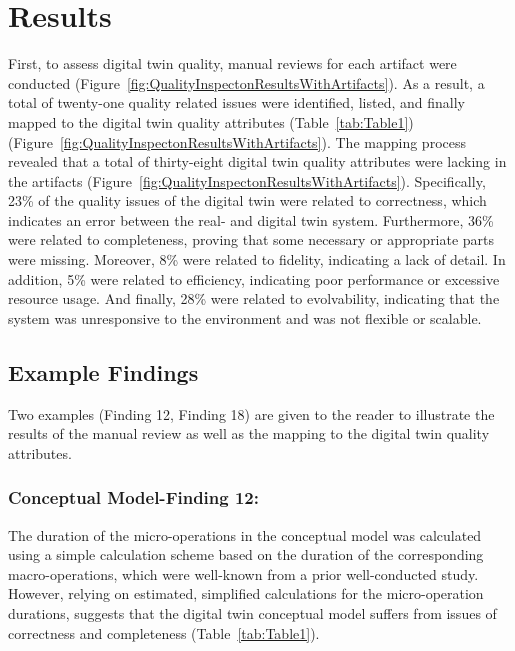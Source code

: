 \documentclass{llncs}
\begin{document}
    \section{Results}
    First, to assess digital twin quality, manual reviews for each artifact were conducted (Figure~\ref{fig:QualityInspectonResultsWithArtifacts}). 
    As a result, a total of twenty-one quality related issues were identified, listed, and finally mapped to the digital twin quality attributes (Table~\ref{tab:Table1}) (Figure~\ref{fig:QualityInspectonResultsWithArtifacts}).
    The mapping process revealed that a total of thirty-eight digital twin quality attributes were lacking in the artifacts (Figure~\ref{fig:QualityInspectonResultsWithArtifacts}).  
    Specifically, 23\% of the quality issues of the digital twin were related to correctness, which indicates an error between the real- and digital twin system. Furthermore, 36\%  were related 
    to completeness, proving that some necessary or appropriate parts were missing.
    Moreover, 8\%  were related to fidelity, indicating a lack of detail. 
    In addition, 5\%  were related to efficiency, indicating poor performance or excessive resource usage.
    And finally, 28\% were related to evolvability, indicating that the system was unresponsive 
    to the environment and was not flexible or scalable.
    \subsection{Example Findings}  
    Two examples (Finding 12, Finding 18) are given to the reader to illustrate 
    the results of the manual review as well as the mapping to the digital twin quality attributes. 
    \subsubsection{Conceptual Model-Finding 12:}
    The duration of the micro-operations in the conceptual model was calculated using a simple calculation 
    scheme based on the duration of the corresponding macro-operations,
     which were well-known from a prior well-conducted study. 
    However, relying on estimated, 
    simplified calculations for the micro-operation durations,
    suggests that the digital twin conceptual model suffers from issues of correctness and completeness (Table~\ref{tab:Table1}). 
\end{document}
